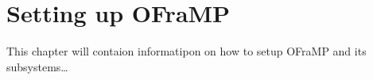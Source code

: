 \chapter{Setting up OFraMP}

This chapter will contaion informatipon on how to setup OFraMP and its subsystems\ldots

\nlipsum
